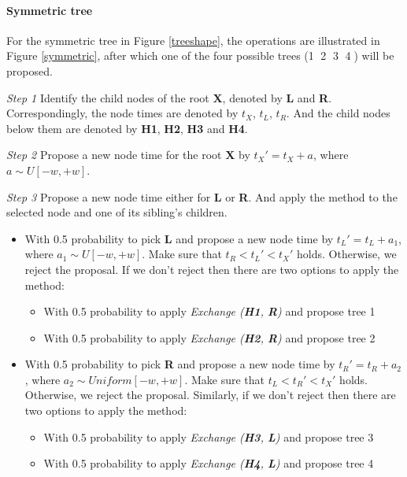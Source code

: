 \documentclass{bmcart}
\begin{document}
\paragraph*{Symmetric tree}

For the symmetric tree in Figure \ref{treeshape}, the operations are illustrated in Figure \ref{symmetric}, after which one of the four possible trees (\textcircled1 \textcircled2 \textcircled3 \textcircled4) will be proposed.

\emph{Step 1} Identify the child nodes of the root \textbf{X}, denoted by \textbf{L} and \textbf{R}. Correspondingly, the node times are denoted by $t_X$, $t_L$, $t_R$. And the child nodes below them are denoted by \textbf{H1}, \textbf{H2}, \textbf{H3} and \textbf{H4}.

\emph{Step 2} Propose a new node time for the root \textbf{X} by ${t_X}' = {t_X} + a$, where $a \sim U[ - w, + w]$.

\emph{Step 3} Propose a new node time either for \textbf{L} or \textbf{R}. And apply the method to the selected node and one of its sibling's children.
\begin{itemize}
\item With 0.5 probability to pick \textbf{L} and propose a new node time by ${t_L}' = {t_L} + {a_1}$, where ${a_1} \sim U[ - w, + w]$. Make sure that ${t_R} < {t_L}' < {t_X}'$ holds. Otherwise, we reject the proposal. If we don't reject then there are two options to apply the method:
\begin{itemize}
\item With 0.5 probability to apply \textit{Exchange (\textbf{H1}, \textbf{R})} and propose tree \textcircled1

\item With 0.5 probability to apply \textit{Exchange (\textbf{H2}, \textbf{R})} and propose tree \textcircled2
\end{itemize}

\item With 0.5 probability to pick \textbf{R} and propose a new node time by ${t_R}' = {t_R} + {a_2}$, where ${a_2} \sim Uniform[ - w, + w]$. Make sure that ${t_L} < {t_R}' < {t_X}'$ holds. Otherwise, we reject the proposal. Similarly, if we don't reject then there are two options to apply the method:
  \begin{itemize}
  \item With 0.5 probability to apply \textit{Exchange (\textbf{H3}, \textbf{L})} and propose tree \textcircled3
  \item With 0.5 probability to apply \textit{Exchange (\textbf{H4}, \textbf{L})} and propose tree \textcircled4
  \end{itemize}
\end{itemize}
\end{document}
